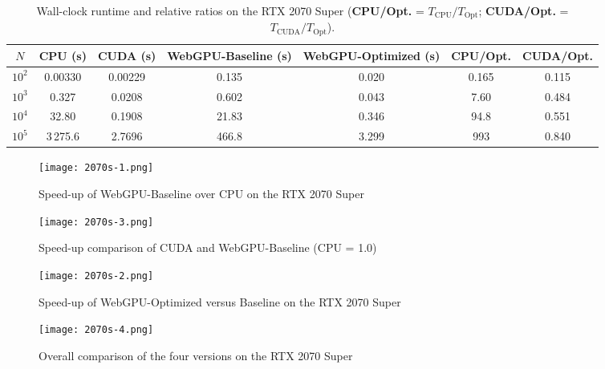 \documentclass[PhD]{PHlab-thesis}
\begin{document}
\begin{table}[ht]
  \centering
  \caption{Wall-clock runtime and relative ratios on the RTX 2070 Super
           (\textbf{CPU/Opt.} = $T_{\text{CPU}}/T_{\text{Opt}}$;
            \textbf{CUDA/Opt.} = $T_{\text{CUDA}}/T_{\text{Opt}}$).}
  \label{tab:rtx_performance}
  \renewcommand{\arraystretch}{2}
  \setlength{\tabcolsep}{4pt}
  \small
  \begin{tabular}{|c|c|c|c|c|c|c|}
    \hline
    $N$ & CPU (s) & CUDA (s) & WebGPU-Baseline (s) & WebGPU-Optimized (s) & CPU/Opt. & CUDA/Opt. \\
    \hline
    $10^{2}$ & 0.00330   & 0.00229  & 0.135 & 0.020 & 0.165 & 0.115 \\
    $10^{3}$ & 0.327     & 0.0208   & 0.602 & 0.043 & 7.60  & 0.484 \\
    $10^{4}$ & 32.80     & 0.1908   & 21.83 & 0.346 & 94.8  & 0.551 \\
    $10^{5}$ & 3\,275.6  & 2.7696   & 466.8 & 3.299 & 993   & 0.840 \\
    \hline
  \end{tabular}
\end{table}




\begin{figure}[htbp]
  \centering
  \texttt{[image: 2070s-1.png]}
  \caption{Speed-up of WebGPU-Baseline over CPU on the RTX 2070 Super}
  \label{fig:2070s-wgpu-baseline}
\end{figure}

\begin{figure}[htbp]
  \centering
  \texttt{[image: 2070s-3.png]}
  \caption{Speed-up comparison of CUDA and WebGPU-Baseline (CPU = 1.0)}
  \label{fig:2070s-cuda-vs-baseline}
\end{figure}

\begin{figure}[htbp]
  \centering
  \texttt{[image: 2070s-2.png]}
  \caption{Speed-up of WebGPU-Optimized versus Baseline on the RTX 2070 Super}
  \label{fig:2070s-optimized-vs-baseline}
\end{figure}

\begin{figure}[htbp]
  \centering
  \texttt{[image: 2070s-4.png]}
  \caption{Overall comparison of the four versions on the RTX 2070 Super}
  \label{fig:2070s-overall-4versions}
\end{figure}

\newpage
\end{document}
